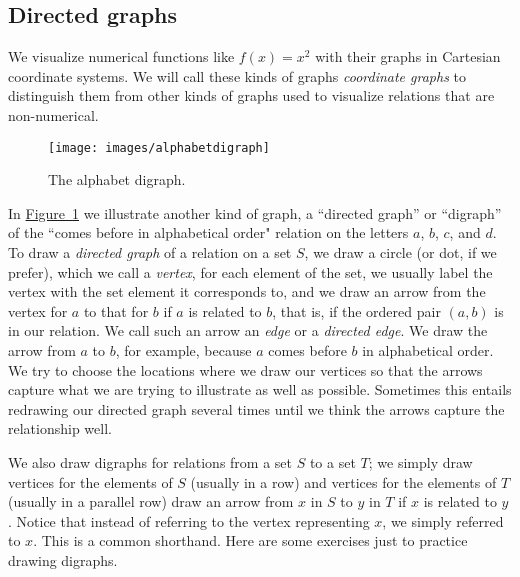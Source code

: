 \documentclass[10pt,]{book}
\theoremstyle{plain}
\theoremstyle{definition}
\numberwithin{equation}{chapter}
\begin{document}
\subsection[{Directed graphs}]{Directed graphs}\label{relationdigraph}
We visualize numerical functions like \(f(x)=x^2\) with their graphs in Cartesian coordinate systems. We will call these kinds of graphs \emph{coordinate graphs} to distinguish them from other kinds of graphs used to visualize relations that are non-numerical.%
\begin{figure}
\centering
\texttt{[image: images/alphabetdigraph]}
\caption{The alphabet digraph.\label{alphabetdigraph}}
\end{figure}
In \hyperref[alphabetdigraph]{Figure~\ref{alphabetdigraph}} we illustrate another kind of graph, a ``directed graph'' or ``digraph'' of the ``comes before in alphabetical order" relation on the letters \(a\), \(b\), \(c\), and \(d\). To draw a \emph{directed graph} of a relation on a set \(S\), we draw a circle (or dot, if we prefer), which we call a \emph{vertex}, for each element of the set, we usually label the vertex with the set element it corresponds to, and we draw an arrow from the vertex for \(a\) to that for \(b\) if \(a\) is related to \(b\), that is, if the ordered pair \((a,b)\) is in our relation. We call such an arrow an \emph{edge} or a \emph{directed edge}. We draw the arrow from \(a\) to \(b\), for example, because \(a\) comes before \(b\) in alphabetical order. We try to choose the locations where we draw our vertices so that the arrows capture what we are trying to illustrate as well as possible. Sometimes this entails redrawing our directed graph several times until we think the arrows capture the relationship well.%
\par
We also draw digraphs for relations from a set \(S\) to a set \(T\); we simply draw vertices for the elements of \(S\) (usually in a row) and vertices for the elements of \(T\) (usually in a parallel row) draw an arrow from \(x\) in \(S\) to \(y\) in \(T\) if \(x\) is related to \(y\). Notice that instead of referring to the vertex representing \(x\), we simply referred to \(x\). This is a common shorthand. Here are some exercises just to practice drawing digraphs.%
\end{document}

